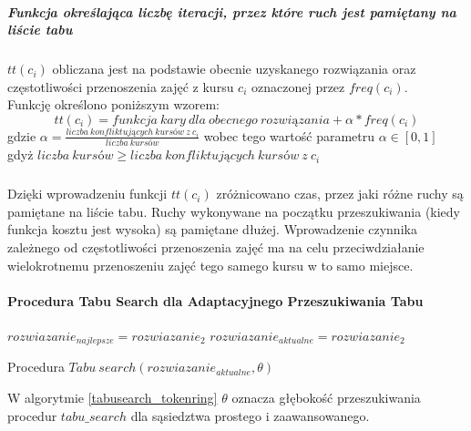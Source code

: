 \subparagraph{Funkcja określająca liczbę iteracji, przez które ruch jest pamiętany na liście tabu} $tt(c_{i})$ obliczana jest na podstawie obecnie uzyskanego rozwiązania oraz częstotliwości przenoszenia zajęć z kursu $c_{i}$ oznaczonej przez $freq(c_{i})$. \\
Funkcję określono poniższym wzorem: 
 \[tt(c_{i}) = funkcja\ kary\ dla\ obecnego\ rozwiązania + \alpha * freq(c_{i}) \] 
gdzie ${\alpha = \frac{liczba\ konfliktujących\ kursów\ z\ c_{i}}{liczba\ kursów}}$ wobec tego wartość parametru ${\alpha \in [0, 1]}$ \\
gdyż ${liczba\ kursów \geq liczba\ konfliktujących\ kursów\ z\ c_{i}} $
\subparagraph{}Dzięki wprowadzeniu funkcji $tt(c_i)$ zróżnicowano czas, przez jaki różne ruchy są pamiętane na liście tabu. Ruchy wykonywane na początku przeszukiwania (kiedy funkcja kosztu jest wysoka) są pamiętane dłużej. Wprowadzenie czynnika zależnego od częstotliwości przenoszenia zajęć ma na celu przeciwdziałanie wielokrotnemu przenoszeniu zajęć tego samego kursu w to samo miejsce.

\paragraph{Procedura Tabu Search dla Adaptacyjnego Przeszukiwania Tabu}
\hfill
\begin{algorithm}[H]
    
    \begin{algorithmic}
    \STATE $rozwiazanie_{najlepsze} = rozwiazanie_2$
    \STATE $rozwiazanie_{aktualne} = rozwiazanie_2$
    \ENDIF

    \ENDWHILE
    \caption{Procedura $Tabu~search(rozwiazanie_{aktualne}, \theta)$}
    \label{tabusearch_tokenring}
    \end{algorithmic}
    \end{algorithm}
\par W algorytmie \ref{tabusearch_tokenring} $\theta$ oznacza głębokość przeszukiwania procedur $tabu\_search$ dla sąsiedztwa prostego i zaawansowanego.

